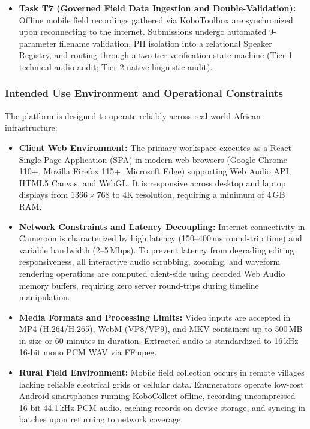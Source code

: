 \documentclass[conference]{IEEEtran}
\begin{document}
\begin{itemize}
    \item \textbf{Task T7 (Governed Field Data Ingestion and Double-Validation):} Offline mobile field recordings gathered via KoboToolbox are synchronized upon reconnecting to the internet. Submissions undergo automated 9-parameter filename validation, PII isolation into a relational Speaker Registry, and routing through a two-tier verification state machine (Tier 1 technical audio audit; Tier 2 native linguistic audit).
\end{itemize}

\subsubsection{Intended Use Environment and Operational Constraints}
\label{sec:design:ucd:environment}
The platform is designed to operate reliably across real-world African infrastructure:
\begin{itemize}
    \item \textbf{Client Web Environment:} The primary workspace executes as a React Single-Page Application (SPA) in modern web browsers (Google Chrome 110+, Mozilla Firefox 115+, Microsoft Edge) supporting Web Audio API, HTML5 Canvas, and WebGL. It is responsive across desktop and laptop displays from $1366\times 768$ to $4$K resolution, requiring a minimum of 4\,GB RAM.
    \item \textbf{Network Constraints and Latency Decoupling:} Internet connectivity in Cameroon is characterized by high latency (150--400\,ms round-trip time) and variable bandwidth (2--5\,Mbps). To prevent latency from degrading editing responsiveness, all interactive audio scrubbing, zooming, and waveform rendering operations are computed client-side using decoded Web Audio memory buffers, requiring zero server round-trips during timeline manipulation.
    \item \textbf{Media Formats and Processing Limits:} Video inputs are accepted in MP4 (H.264/H.265), WebM (VP8/VP9), and MKV containers up to 500\,MB in size or 60 minutes in duration. Extracted audio is standardized to 16\,kHz 16-bit mono PCM WAV via FFmpeg.
    \item \textbf{Rural Field Environment:} Mobile field collection occurs in remote villages lacking reliable electrical grids or cellular data. Enumerators operate low-cost Android smartphones running KoboCollect offline, recording uncompressed 16-bit 44.1\,kHz PCM audio, caching records on device storage, and syncing in batches upon returning to network coverage.
\end{itemize}
\end{document}
